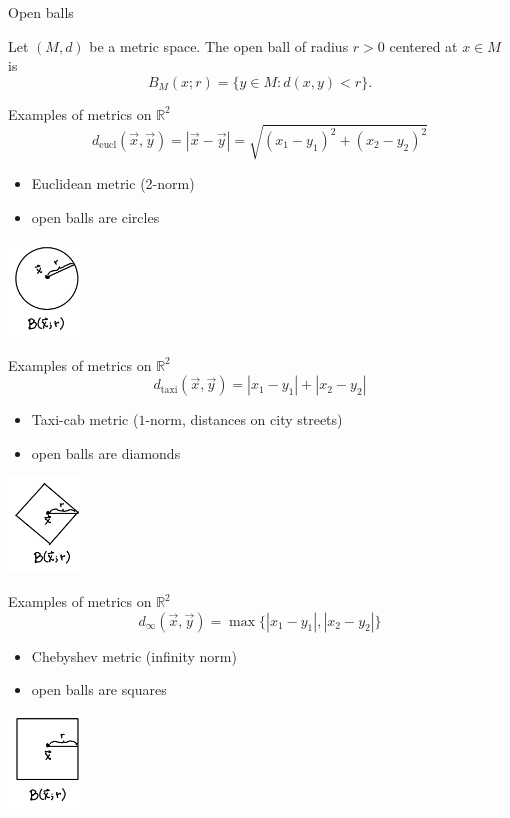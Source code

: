 \documentclass{beamer}
\begin{document}
\begin{frame}{Open balls}
\pause
\begin{defn}
Let $(M,d)$ be a metric space.
The open ball of radius $r>0$ centered at $x\in M$ is
$$B_M(x;r) = \{y\in M: d(x,y) < r\}.$$
\end{defn}
\end{frame}

\begin{frame}{Examples of metrics on $\mathbb{R}^2$}
$$d_{\text{eucl}}(\vec x,\vec y) = |\vec x - \vec y| = \sqrt{(x_1-y_1)^2 + (x_2-y_2)^2}$$
\begin{itemize}
\pause
\item Euclidean metric (2-norm)
\pause
\item open balls are circles
\end{itemize}
\pause
\begin{center}
\includegraphics[height=1in]{fig/ball2.png}
\end{center}
\end{frame}

\begin{frame}{Examples of metrics on $\mathbb{R}^2$}
$$d_{\text{taxi}}(\vec x,\vec y) = |x_1-y_1| + |x_2-y_2|$$
\begin{itemize}
\pause
\item Taxi-cab metric ($1$-norm, distances on city streets)
\pause
\item open balls are diamonds
\end{itemize}
\pause
\begin{center}
\includegraphics[height=1in]{fig/ball1.png}
\end{center}
\end{frame}

\begin{frame}{Examples of metrics on $\mathbb{R}^2$}
$$d_{\infty}(\vec x,\vec y) = \max\{|x_1-y_1|,|x_2-y_2|\}$$
\begin{itemize}
\pause
\item Chebyshev metric (infinity norm)
\pause
\item open balls are squares
\end{itemize}
\pause
\begin{center}
\includegraphics[height=1in]{fig/ballinf.png}
\end{center}
\end{frame}
\end{document}
